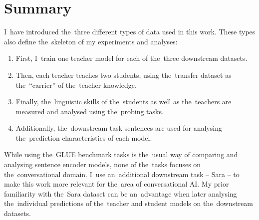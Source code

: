 \documentclass[bsc,frontabs,singlespacing,parskip,deptreport]{infthesis}
\begin{document}
{  \section{Summary}{
    I~have introduced the~three different types of data used in this work. These types also define the~skeleton of my experiments and analyses:
    \begin{enumerate}
      \item First, I~train one teacher model for each of the~three downstream datasets.
      \item Then, each teacher teaches two students, using the~transfer dataset as the~``carrier'' of the~teacher knowledge.
      \item Finally, the~linguistic skills of the~students as well as the~teachers are measured and analysed using the~probing tasks.
      \item Additionally, the~downstream task sentences are used for analysing the~prediction characteristics of each model.
    \end{enumerate}
    While using the~GLUE benchmark tasks is the~usual way of comparing and analysing sentence encoder models, none of the~tasks focuses on the~conversational domain. I~use an~additional downstream task -- Sara -- to make this work more relevant for the~area of conversational AI.
    My prior familiarity with the~Sara dataset can be an~advantage when later analysing the~individual predictions of the~teacher and student models on the~downstream datasets.
  }
}
\end{document}
